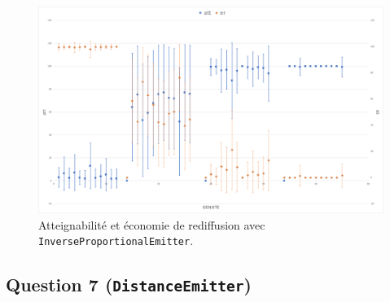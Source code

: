 \documentclass[a4paper]{article}
\begin{document}
\begin{figure}[H]
\begin{minipage}{\textwidth}
  \centering
    \includegraphics[width=\textwidth]{images/ex2x8-2.png}
    \caption{Atteignabilité et économie de rediffusion avec \texttt{InverseProportionalEmitter}.}
\end{minipage}
\end{figure}


\subsection{Question 7 (\texttt{DistanceEmitter})}
\end{document}
